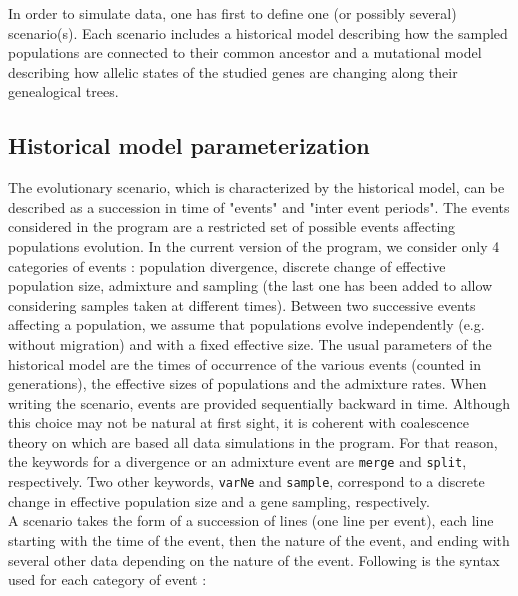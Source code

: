  
 In order to simulate data, one has first to define one (or possibly
several) scenario(s). Each scenario includes a historical model describing
how the sampled populations  are connected to their common ancestor
and a mutational model describing how allelic states of the studied
genes are changing along their genealogical trees.\\

\subsection{Historical model parameterization}
The evolutionary scenario, which is characterized by the historical
model, can be described as a succession in time of "events" and
"inter event periods". The events considered in the program are a
restricted set of possible events affecting populations evolution.
In the current version of the program, we consider only 4 categories
of events : population divergence, 
discrete change of effective population size, admixture and sampling (the last one has been added
to allow considering samples taken at different times). Between two successive
events affecting a population, we assume that populations evolve
independently (e.g. without migration) and with a fixed effective
size. The usual parameters of the historical model are the times of
occurrence of the various events (counted in generations), the
effective sizes of populations and the admixture rates. When writing
the scenario, events are provided sequentially backward in time.
Although this choice may not be natural at first sight, it is coherent with
coalescence theory on which are based all data simulations in the
program. For that reason, the keywords for a divergence or an
admixture event are \texttt{merge} and \texttt{split}, respectively.
Two other keywords, \texttt{varNe} and \texttt{sample},
correspond to a discrete change in effective population size and a gene
sampling, respectively. 
\\
A scenario takes the form of a succession of lines (one line per
event), each line starting with the time of the event, then the
nature of the event, and ending with several other data depending on
the nature of the event. Following is the syntax used for each
category of event :
